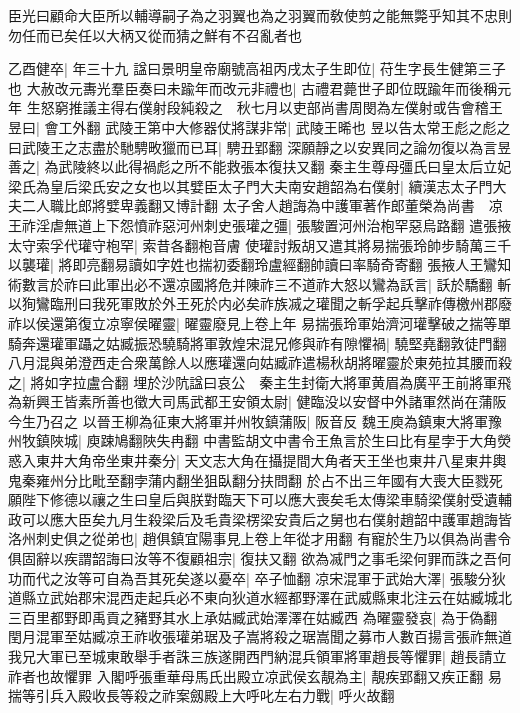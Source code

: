 臣光曰顧命大臣所以輔導嗣子為之羽翼也為之羽翼而敎使剪之能無斃乎知其不忠則勿任而已矣任以大柄又從而猜之鮮有不召亂者也

乙酉健卒|{
	年三十九}
諡曰景明皇帝廟號高祖丙戌太子生即位|{
	苻生字長生健第三子也}
大赦改元夀光羣臣奏曰未踰年而改元非禮也|{
	古禮君薨世子即位既踰年而後稱元年}
生怒窮推議主得右僕射段純殺之　秋七月以吏部尚書周閔為左僕射或告會稽王昱曰|{
	會工外翻}
武陵王第中大修器仗將謀非常|{
	武陵王晞也}
昱以告太常王彪之彪之曰武陵王之志盡於馳騁畋獵而已耳|{
	騁丑郢翻}
深願靜之以安異同之論勿復以為言昱善之|{
	為武陵終以此得禍彪之所不能救張本復扶又翻}
秦主生尊母彊氏曰皇太后立妃梁氏為皇后梁氏安之女也以其嬖臣太子門大夫南安趙韶為右僕射|{
	續漢志太子門大夫二人職比郎將嬖卑義翻又博計翻}
太子舍人趙誨為中護軍著作郎董榮為尚書　凉王祚淫虐無道上下怨憤祚惡河州刺史張瓘之彊|{
	張駿置河州治枹罕惡烏路翻}
遣張掖太守索孚代瓘守枹罕|{
	索昔各翻枹音膚}
使瓘討叛胡又遣其將易揣張玲帥步騎萬三千以襲瓘|{
	將即亮翻易讀如字姓也揣初委翻玲盧經翻帥讀曰率騎奇寄翻}
張掖人王鸞知術數言於祚曰此軍出必不還凉國將危并陳祚三不道祚大怒以鸞為訞言|{
	訞於驕翻}
斬以狥鸞臨刑曰我死軍敗於外王死於内必矣祚族㓕之瓘聞之斬孚起兵擊祚傳檄州郡廢祚以侯還第復立凉寧侯曜靈|{
	曜靈廢見上卷上年}
易揣張玲軍始濟河瓘擊破之揣等單騎奔還瓘軍躡之姑臧振恐驍騎將軍敦煌宋混兄修與祚有隙懼禍|{
	驍堅堯翻敦徒門翻}
八月混與弟澄西走合衆萬餘人以應瓘還向姑臧祚遣楊秋胡將曜靈於東苑拉其腰而殺之|{
	將如字拉盧合翻}
埋於沙阬諡曰哀公　秦主生封衛大將軍黄眉為廣平王前將軍飛為新興王皆素所善也徵大司馬武都王安領太尉|{
	健臨没以安督中外諸軍然尚在蒲阪今生乃召之}
以晉王柳為征東大將軍并州牧鎮蒲阪|{
	阪音反}
魏王庾為鎮東大將軍豫州牧鎮陜城|{
	庾踈鳩翻陜失冉翻}
中書監胡文中書令王魚言於生曰比有星孛于大角熒惑入東井大角帝坐東井秦分|{
	天文志大角在攝提間大角者天王坐也東井八星東井輿鬼秦雍州分比毗至翻孛蒲内翻坐狙臥翻分扶問翻}
於占不出三年國有大喪大臣戮死願陛下修德以禳之生曰皇后與朕對臨天下可以應大喪矣毛太傳梁車騎梁僕射受遺輔政可以應大臣矣九月生殺梁后及毛貴梁楞梁安貴后之舅也右僕射趙韶中護軍趙誨皆洛州刺史俱之從弟也|{
	趙俱鎮宜陽事見上卷上年從才用翻}
有寵於生乃以俱為尚書令俱固辭以疾謂韶誨曰汝等不復顧祖宗|{
	復扶又翻}
欲為㓕門之事毛梁何罪而誅之吾何功而代之汝等可自為吾其死矣遂以憂卒|{
	卒子恤翻}
凉宋混軍于武始大澤|{
	張駿分狄道縣立武始郡宋混西走起兵必不東向狄道水經都野澤在武威縣東北注云在姑臧城北三百里都野即禹貢之豬野其水上承姑臧武始澤澤在姑臧西}
為曜靈發哀|{
	為于偽翻}
閏月混軍至姑臧凉王祚收張瓘弟琚及子嵩將殺之琚嵩聞之募市人數百揚言張祚無道我兄大軍已至城東敢舉手者誅三族遂開西門納混兵領軍將軍趙長等懼罪|{
	趙長請立祚者也故懼罪}
入閣呼張重華母馬氏出殿立凉武侯玄靚為主|{
	靚疾郢翻又疾正翻}
易揣等引兵入殿收長等殺之祚案劔殿上大呼叱左右力戰|{
	呼火故翻}
